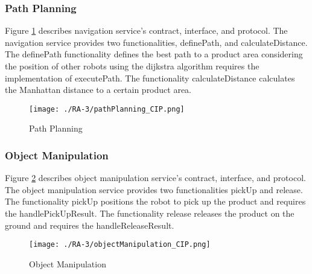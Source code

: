 \subsubsection{Path Planning} %
Figure \ref{fig:pathplanning_cip} describes navigation service's contract, interface, and protocol. The navigation service provides two functionalities, definePath, and calculateDistance. The definePath functionality defines the best path to a product area considering the position of other robots using the dijkstra algorithm requires the implementation of executePath. The functionality calculateDistance calculates the Manhattan distance to a certain product area.
\begin{figure}[ht!]
 \centering
 \texttt{[image: ./RA-3/pathPlanning\_CIP.png]}
 \caption{Path Planning}
 \label{fig:pathplanning_cip}
\end{figure}

\subsubsection{Object Manipulation} %
Figure \ref{fig:objectmanipulation_cip} describes object manipulation service's contract, interface, and protocol. The object manipulation service provides two functionalities pickUp and release. The functionality pickUp positions the robot to pick up the product and requires the handlePickUpResult. The functionality release releases the product on the ground and requires the handleReleaseResult. 
\begin{figure}[ht!]
 \centering
 \texttt{[image: ./RA-3/objectManipulation\_CIP.png]}
 \caption{Object Manipulation}
 \label{fig:objectmanipulation_cip}
\end{figure}


